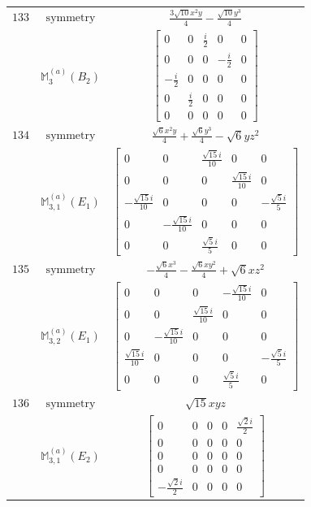 \documentclass[fleqn,8pt,landscape]{jsarticle}
\begin{document}
\begin{longtable}{ccc}
$ 133 $ & $ \text{symmetry} $ & $ \frac{3 \sqrt{10} x^{2} y}{4} - \frac{\sqrt{10} y^{3}}{4} $ \\
$  $ & $ \mathbb{M}_{3}^{(a)}(B_{2}) $ & $ \begin{bmatrix} 0 & 0 & \frac{i}{2} & 0 & 0 \\ 0 & 0 & 0 & - \frac{i}{2} & 0 \\ - \frac{i}{2} & 0 & 0 & 0 & 0 \\ 0 & \frac{i}{2} & 0 & 0 & 0 \\ 0 & 0 & 0 & 0 & 0 \end{bmatrix} $ \\ \hline
$ 134 $ & $ \text{symmetry} $ & $ \frac{\sqrt{6} x^{2} y}{4} + \frac{\sqrt{6} y^{3}}{4} - \sqrt{6} y z^{2} $ \\
$  $ & $ \mathbb{M}_{3,1}^{(a)}(E_{1}) $ & $ \begin{bmatrix} 0 & 0 & \frac{\sqrt{15} i}{10} & 0 & 0 \\ 0 & 0 & 0 & \frac{\sqrt{15} i}{10} & 0 \\ - \frac{\sqrt{15} i}{10} & 0 & 0 & 0 & - \frac{\sqrt{5} i}{5} \\ 0 & - \frac{\sqrt{15} i}{10} & 0 & 0 & 0 \\ 0 & 0 & \frac{\sqrt{5} i}{5} & 0 & 0 \end{bmatrix} $ \\ \hline
$ 135 $ & $ \text{symmetry} $ & $ - \frac{\sqrt{6} x^{3}}{4} - \frac{\sqrt{6} x y^{2}}{4} + \sqrt{6} x z^{2} $ \\
$  $ & $ \mathbb{M}_{3,2}^{(a)}(E_{1}) $ & $ \begin{bmatrix} 0 & 0 & 0 & - \frac{\sqrt{15} i}{10} & 0 \\ 0 & 0 & \frac{\sqrt{15} i}{10} & 0 & 0 \\ 0 & - \frac{\sqrt{15} i}{10} & 0 & 0 & 0 \\ \frac{\sqrt{15} i}{10} & 0 & 0 & 0 & - \frac{\sqrt{5} i}{5} \\ 0 & 0 & 0 & \frac{\sqrt{5} i}{5} & 0 \end{bmatrix} $ \\ \hline
$ 136 $ & $ \text{symmetry} $ & $ \sqrt{15} x y z $ \\
$  $ & $ \mathbb{M}_{3,1}^{(a)}(E_{2}) $ & $ \begin{bmatrix} 0 & 0 & 0 & 0 & \frac{\sqrt{2} i}{2} \\ 0 & 0 & 0 & 0 & 0 \\ 0 & 0 & 0 & 0 & 0 \\ 0 & 0 & 0 & 0 & 0 \\ - \frac{\sqrt{2} i}{2} & 0 & 0 & 0 & 0 \end{bmatrix} $ \\ \hline

\end{longtable}
\end{document}
